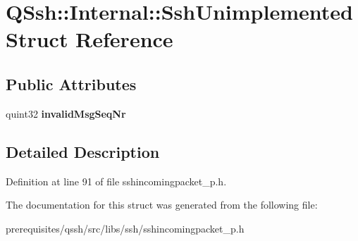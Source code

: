 \hypertarget{struct_q_ssh_1_1_internal_1_1_ssh_unimplemented}{}\section{Q\+Ssh\+:\+:Internal\+:\+:Ssh\+Unimplemented Struct Reference}
\label{struct_q_ssh_1_1_internal_1_1_ssh_unimplemented}
\subsection*{Public Attributes}
\begin{DoxyCompactItemize}
\item 
\mbox{\label{struct_q_ssh_1_1_internal_1_1_ssh_unimplemented_ac8268d70660fd5344704dde9220078db}} 
quint32 {\bfseries invalid\+Msg\+Seq\+Nr}
\end{DoxyCompactItemize}


\subsection{Detailed Description}


Definition at line 91 of file sshincomingpacket\+\_\+p.\+h.



The documentation for this struct was generated from the following file\+:\begin{DoxyCompactItemize}
\item 
prerequisites/qssh/src/libs/ssh/sshincomingpacket\+\_\+p.\+h\end{DoxyCompactItemize}
